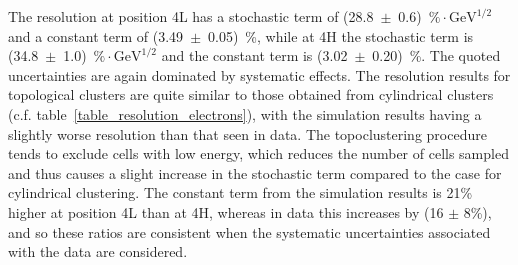 The resolution at position 4L has a stochastic term of (28.8~$\pm$~0.6)~$\% \cdot \mathrm{GeV}^{1/2}$ and a constant term of (3.49~$\pm$~0.05)~\%, while at 4H the stochastic term is (34.8~$\pm$~1.0)~$\% \cdot \mathrm{GeV}^{1/2}$ and the constant term is (3.02~$\pm$~0.20)~\%. The quoted uncertainties are again dominated by systematic effects. The resolution results for topological clusters are quite similar to those obtained from cylindrical clusters (c.f. table~\ref{table_resolution_electrons}), with the simulation results having a slightly worse resolution than that seen in data. The topoclustering procedure tends to exclude cells with low energy, which reduces the number of cells sampled and thus causes a slight increase in the stochastic term compared to the case for cylindrical clustering. The constant term from the simulation results is 21\% higher at position 4L than at 4H, whereas in data this increases by (16 $\pm$ 8\%), and so these ratios are consistent when the systematic uncertainties associated with the data are considered. 

%









